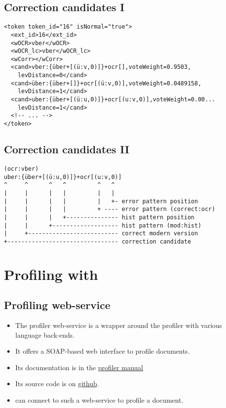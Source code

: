 \subsection{Correction candidates I}
\begin{frame}[fragile]
	\begin{verbatim}
<token token_id="16" isNormal="true">
  <ext_id>16</ext_id>
  <wOCR>vber</wOCR>
  <wOCR_lc>vber</wOCR_lc>
  <wCorr></wCorr>
  <cand>vber:{über+[(ü:v,0)]}+ocr[],voteWeight=0.9503,
    levDistance=0</cand>
  <cand>über:{über+[]}+ocr[(ü:v,0)],voteWeight=0.0489158,
    levDistance=1</cand>
  <cand>uber:{über+[(ü:u,0)]}+ocr[(u:v,0)],voteWeight=0.00...
    levDistance=1</cand>
  <!-- ... -->
</token>
\end{verbatim}
\end{frame}

\subsection{Correction candidates II}
\begin{frame}[fragile]
	\begin{Verbatim}[fontsize=\small]
(ocr:vber)
uber:{über+[(ü:u,0)]}+ocr[(u:v,0)]
^     ^      ^   ^         ^   ^
|     |      |   |         |   |
|     |      |   |         |   +- error pattern position
|     |      |   |         + ---- error pattern (correct:ocr)
|     |      |   +--------------- hist pattern position
|     |      +------------------- hist pattern (mod:hist)
|     +-------------------------- correct modern version
+-------------------------------- correction candidate
\end{Verbatim}
\end{frame}

\section{Profiling with \pocoto}
\subsection{Profiling web-service}
\begin{frame}
	\begin{itemize}
		\item The profiler web-service is a wrapper around the profiler with various
			language back-ends.
		\item It offers a SOAP-based web interface to profile documents.
		\item Its documentation is in the
			\href{https://github.com/cisocrgroup/Resources/blob/master/manuals/profiler-manual.pdf}{profiler manual}
		\item Its source code is on
			\href{https://github.com/cisocrgroup/ProfilerWebService}{github}.
		\item \pocoto{} can connect to such a web-service to profile a document.
	\end{itemize}
\end{frame}


